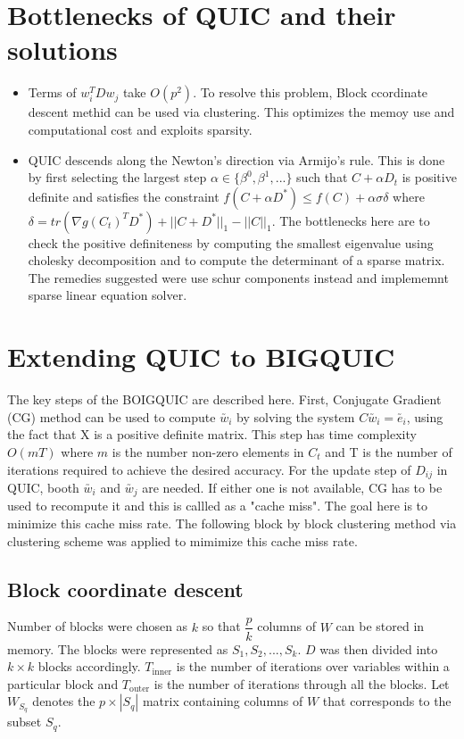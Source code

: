 \documentclass[12pt]{article}
\begin{document}
\section{Bottlenecks of QUIC and their solutions}
\begin{itemize}
\item Terms of $w_i^TDw_j$ take $O(p^2)$. To resolve this problem, Block ccordinate descent methid can be used via clustering. This optimizes the memoy use and computational cost and exploits sparsity.
\item QUIC descends along the Newton's direction via Armijo's rule. This is done by first selecting the largest step $\alpha \in \{ \beta^{0},\beta^{1},...\}$ such that $C+\alpha D_t$ is positive definite and satisfies the constraint $f(C+\alpha D^{*}) \leq f(C)+\alpha\sigma\delta$ where $\delta=tr(\nabla g(C_t)^{T}D^{*})+||C+D^{*}||_{1}-||C||_1$. The bottlenecks here are to check the positive definiteness by computing the smallest eigenvalue using cholesky decomposition and to compute the determinant of a sparse matrix. The remedies suggested were use schur components instead and implememnt sparse linear equation solver.
\end{itemize}

\section{Extending QUIC to BIGQUIC}
The key steps of the BOIGQUIC are described here. First, Conjugate Gradient (CG) method can be used to compute $\utilde{w_i}$ by solving the system $C\utilde{w_i}=\utilde{e_i}$, using the fact that X is a positive definite matrix. This step has time complexity $O(mT)$ where $m$ is the number  non-zero elements in $C_t$ and T is the number of iterations required to achieve the desired accuracy. For the update step of $D_{ij}$ in QUIC, booth $\utilde{w_i}$ and $\utilde{w_j}$ are needed. If either one is not available, CG has to be used to recompute it and this is callled as a "cache miss". The goal here is to minimize this cache miss rate. The following block by block clustering method via clustering scheme was applied to mimimize this cache miss rate.

\subsection{Block coordinate descent}
Number of blocks were chosen as $k$ so that $\dfrac{p}{k}$ columns of $W$ can be stored in memory. The blocks were represented as $S_1, S_2,..., S_k $. $D$ was then divided into $k\times k$ blocks accordingly. $T_{\text{inner}}$ is the number of iterations over variables within a particular block and $T_{\text{outer}}$ is the number of iterations through all the blocks. Let $W_{S_q}$ denotes the $p\times |S_q|$ matrix containing columns of $W$ that corresponds to the subset $S_q$.
\end{document}

